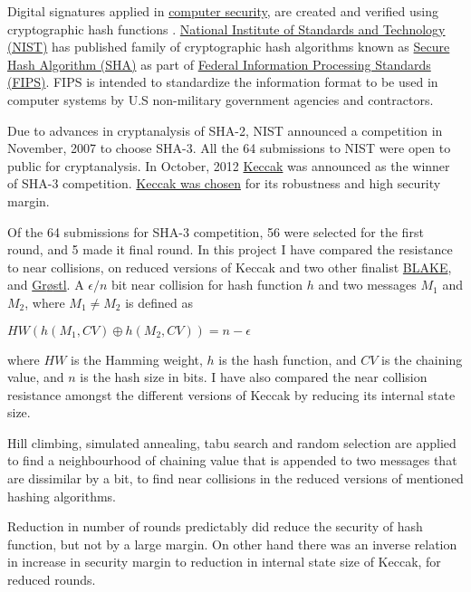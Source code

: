 \begin{abstractpage}

Digital signatures applied in \href{"http://en.wikipedia.org/wiki/Cryptographic\_hash\_function\#Applications"}
{computer security}, are created and verified using cryptographic hash functions \cite{00042}.
\href{"http://www.nist.gov/index.html"}{National Institute of Standards and Technology (NIST)} has published
family of cryptographic hash algorithms known as \href{http://en.wikipedia.org/wiki/Secure_Hash_Algorithm}
{Secure Hash Algorithm (SHA)} as part of \href{http://en.wikipedia.org/wiki/Federal_Information_Processing_Standard}
{Federal Information Processing Standards (FIPS)}. FIPS is intended to standardize the information format
to be used in computer systems by U.S non-military government agencies and contractors.

Due to advances in cryptanalysis of SHA-2, NIST announced a competition in November, 2007 to choose SHA-3. 
All the 64 submissions to NIST were open to public for cryptanalysis. 
In October, 2012 \href{"http://keccak.noekeon.org/"}{Keccak} was announced as the winner of SHA-3 competition. 
\href{"http://csrc.nist.gov/groups/ST/hash/sha-3/sha-3\_selection\_announcement.pdf"}{Keccak was chosen}
for its robustness and high security margin.

Of the 64 submissions for SHA-3 competition, 56 were selected for the first round, and 5 made it final round.
In this project I have compared the resistance to near collisions, on reduced versions of Keccak and two other
finalist \href{"https://131002.net/blake/"}{BLAKE}, and \href{"http://www.groestl.info/"}{Gr{\o}stl}. 
A $\epsilon / n $ bit near collision for hash function $h$ and two messages $M_{1}$ and $M_{2}$, where
$M_{1} \neq M_{2}$ is defined as
\begin{center}$HW( h( M_{1}, CV ) \oplus h( M_{2}, CV ) ) = n - \epsilon $\end{center}
where $HW$ is the Hamming weight, $h$ is the hash function, and $CV$ is the chaining value, and $n$ is the hash 
size in bits. I have also compared the near collision resistance amongst the different versions of Keccak by 
reducing its internal state size.

Hill climbing, simulated annealing, tabu search and random selection are applied to find a neighbourhood of chaining
value that is appended to two messages that are dissimilar by a bit, to find near collisions in the reduced versions 
of mentioned hashing algorithms.

Reduction in number of rounds predictably did reduce the security of hash function, but not by a large margin.
On other hand there was an inverse relation in increase in security margin to reduction in internal state size
of Keccak, for reduced rounds.
  
\end{abstractpage}
